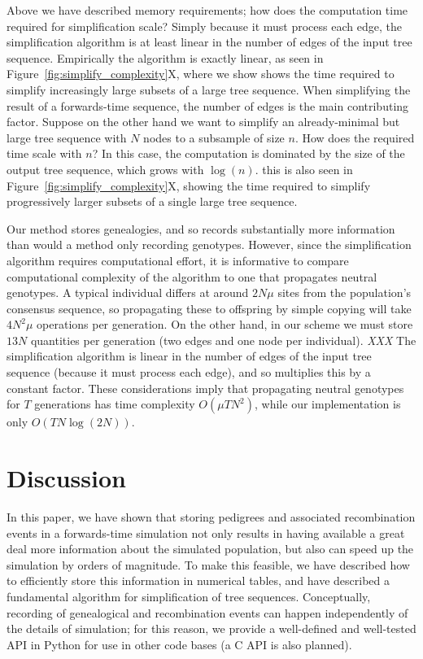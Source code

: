 \documentclass{article}
\newcommand{\plr}[1]{{\em \color{blue} #1}}
\begin{document}
Above we have described memory requirements;
how does the computation time required for simplification scale?
Simply because it must process each edge,
the simplification algorithm is at least linear in the number of edges of the input tree sequence.
Empirically the algorithm is exactly linear,
as seen in Figure~\ref{fig:simplify_complexity}X,
where we show shows the time required to simplify increasingly large subsets of a large tree sequence.
When simplifying the result of a forwards-time sequence, the number of edges is the main contributing factor.
Suppose on the other hand we want to
simplify an already-minimal but large tree sequence with $N$ nodes
to a subsample of size $n$.
How does the required time scale with $n$?
In this case, the computation is dominated by the size of the output tree sequence,
which grows with $\log(n)$.
this is also seen in Figure~\ref{fig:simplify_complexity}X,
showing the time required to simplify progressively larger subsets of a single large tree sequence.


Our method stores genealogies, and so records substantially more information
than would a method only recording genotypes.
However, since the simplification algorithm requires computational effort,
it is informative to compare computational complexity of the algorithm
to one that propagates neutral genotypes.
A typical individual differs at around $2 N \mu$ sites from the population's consensus sequence,
so propagating these to offspring by simple copying will take $4 N^2 \mu$ operations per generation.
On the other hand,
in our scheme we must store $13N$ quantities per generation (two edges and one node per individual).
\plr{XXX}
The simplification algorithm is linear in the number of edges of the input tree sequence
(because it must process each edge),
and so multiplies this by a constant factor.
These considerations imply that propagating neutral genotypes for $T$ generations has time complexity $O(\mu T N^2)$,
while our implementation is only $O(T N \log(2N))$.


\section*{Discussion}

In this paper, we have shown that storing pedigrees
and associated recombination events
in a forwards-time simulation
not only results in having available a great deal more information about the simulated population,
but also can speed up the simulation by orders of magnitude.
To make this feasible,
we have described how to efficiently store this information in numerical tables,
and have described a fundamental algorithm for simplification of tree sequences.
Conceptually, recording of genealogical and recombination events
can happen independently of the details of simulation;
for this reason, we provide a well-defined and well-tested API in Python
for use in other code bases (a C API is also planned).
\end{document}

